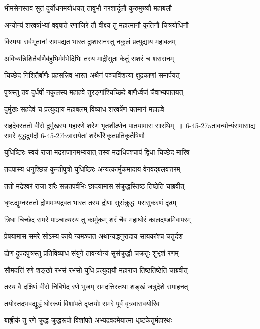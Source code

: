 \twolineshloka
{भीमसेनस्तव सुतं दुर्योधनमयोधयत्}
{तावुभौ नरशार्दूलौ कुरुमुख्यौ महाबलौ}


\twolineshloka
{अन्योन्यं शरवर्षाभ्यां ववृषाते रणाजिरे}
{तौ वीक्ष्य तु महात्मानौ कृतिनौ चित्रयोधिनौ}


\twolineshloka
{विस्मयः सर्वभूतानां समपद्यत भारत}
{दुःशासनस्तु नकुलं प्रत्युद्याय महाबलम्}


\twolineshloka
{अविध्यन्निशितैर्बाणैर्बहुभिर्मर्मभेदिभिः}
{तस्य माद्रीसुतः केतुं सशरं च शरासनम्}


\twolineshloka
{चिच्छेद निशितैर्बाणैः प्रहसन्निव भारत}
{अथैनं पञ्चविंशत्या क्षुद्रकाणां समार्पयत्}


\twolineshloka
{पुत्रस्तु तव दुर्धर्षो नकुलस्य महाहवे}
{तुरङ्गांश्चिच्छिदे बाणैर्ध्वजं चैवाभ्यपातयत्}


\twolineshloka
{दुर्मुखः सहदेवं च प्रत्युद्याय महाबलम्}
{विव्याध शरवर्षेण यतमानं महाहवे}


\threelineshloka
{सहदेवस्ततो वीरो दुर्मुखस्य महारणे}
{शरेण भृतशीक्ष्णेन पातयामास सारथिम् ॥ 6-45-27aतावन्योन्यंसमासाद्य समरे युद्धदुर्मदौ}
{6-45-27bत्रासयेतां शरैर्घोरैःकृतप्रतिकृतैषिणौ}


\twolineshloka
{युधिष्टिरः स्वयं राजा मद्रराजानमभ्ययात्}
{तस्य मद्राधिपश्चापं द्विधा चिच्छेद मारिष}


\twolineshloka
{तदपास्य धनुश्छिन्नं कुन्तीपुत्रो युधिष्ठिरः}
{अन्यत्कार्मुकमादाय वेगवद्बलवत्तरम्}


\twolineshloka
{ततो मद्रेश्वरं राजा शरैः सन्नतपर्वभिः}
{छादयामास संक्रुद्धस्तिष्ठ तिष्ठेति चाब्रवीत्}


\twolineshloka
{धृष्टद्युम्नस्ततो द्रोणमभ्यद्रवत भारत}
{तस्य द्रोणः सुसंक्रुद्धः परासुकरणं दृढम्}


\twolineshloka
{त्रिधा चिच्छेद समरे पाञ्चाल्यस्य तु कार्मुकम्}
{शरं चैव महाघोरं कालदण्डमिवापरम्}


\twolineshloka
{प्रेषयामास समरे सोऽस्य काये न्यमञ्जत}
{अथान्यद्धनुरादाय सायकांश्च चतुर्दश}


\twolineshloka
{द्रोणं द्रुपदपुत्रस्तु प्रतिविव्याध संयुगे}
{तावन्योन्यं सुसंक्रुद्धौ चक्रतुः शुभृशं रणम्}


\twolineshloka
{सौमदत्तिं रणे शङ्खो रभसं रभसो युधि}
{प्रत्युद्ययौ महाराज तिष्ठतिष्ठेति चाब्रवीत्}


\twolineshloka
{तस्य वै दक्षिणं वीरो निर्बिभेद रणे भुजम्}
{समदत्तिस्तथा शङ्खं जत्रुदेशे समाहनत्}


\twolineshloka
{तयोस्तदभवद्युद्धं घोररूपं विशांपते}
{दृप्तयोः समरे पूर्वं वृत्रवासवयोरिव}


\twolineshloka
{बाह्लीकं तु रणे क्रुद्ध क्रुद्धरूपो विशांपते}
{अभ्यद्रवदमेयात्मा धृष्टकेतुर्महारथः}


